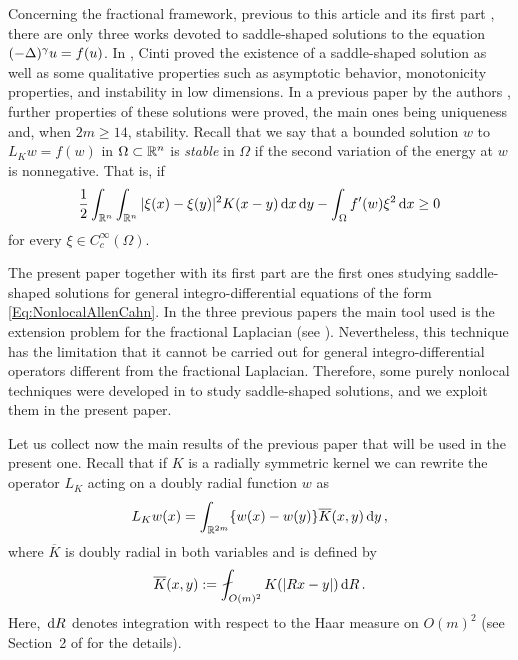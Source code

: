 Concerning the fractional framework, previous to this article and its first part \cite{FelipeSanz-Perela:IntegroDifferentialI}, there are only three works devoted to saddle-shaped solutions to the equation $(-\Delta)^\gamma u = f(u)$. In  \cite{Cinti-Saddle,Cinti-Saddle2}, Cinti proved the existence of a saddle-shaped solution as well as some qualitative properties such as asymptotic behavior, monotonicity properties, and instability in low dimensions. In a previous paper by the authors \cite{Felipe-Sanz-Perela:SaddleFractional}, further properties of these solutions were proved, the main ones being uniqueness and, when $2m\geq 14$, stability. Recall that we say that a bounded solution $w$ to $L_K w = f(w)$ in $\Omega\subset \mathbb{R}^n$ is \emph{stable} in $\Omega$ if the second variation of the energy at $w$ is nonnegative. That is, if
\begin{equation}
\label{Eq:StablityCondition}  
\dfrac{1}{2} \int_{\mathbb{R}^n} \int_{\mathbb{R}^n} |\xi (x) - \xi(y)|^2 K(x - y) \,\mathrm{d} x \,\mathrm{d} y - \int_{\Omega} f'(w) \xi^2 \,\mathrm{d} x \geq 0
\end{equation}
for every $\xi \in C^\infty_c (\Omega)$.


The present paper together with its first part \cite{FelipeSanz-Perela:IntegroDifferentialI} are the first ones studying saddle-shaped solutions for general integro-differential equations of the form \eqref{Eq:NonlocalAllenCahn}. In the three previous papers \cite{Cinti-Saddle, Cinti-Saddle2, Felipe-Sanz-Perela:SaddleFractional} the main tool used is the extension problem for the fractional Laplacian (see \cite{CaffarelliSilvestre}). Nevertheless, this technique has the limitation that it cannot be carried out for general integro-differential operators different from the fractional Laplacian. Therefore, some purely nonlocal techniques were developed in \cite{FelipeSanz-Perela:IntegroDifferentialI} to study saddle-shaped solutions, and we exploit them in the present paper.





Let us collect now the main results of the previous paper \cite{FelipeSanz-Perela:IntegroDifferentialI} that will be used in the present one. Recall that if $K$ is a radially symmetric kernel we can rewrite the operator $L_K$ acting on a doubly radial function $w$ as
$$
L_K w(x) = \int_{\mathbb{R}^{2m}} \{w(x) - w(y)\} \overline{K}(x,y) \,\mathrm{d} y\,,
$$
where $\overline{K}$ is doubly radial in both variables and is defined by
\begin{equation}
\label{Eq:KbarDef}
\overline{K}(x,y) := \average_{O(m)^2} K(|Rx - y|)\d R\,.
\end{equation}
Here, $\,\mathrm{d} R$ denotes integration with respect to the Haar measure on $O(m)^2$ (see Section~2 of \cite{FelipeSanz-Perela:IntegroDifferentialI} for the details).

